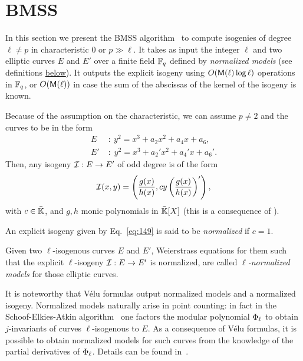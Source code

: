 

\section{BMSS}
\label{sec:bmss}
In this section we present the BMSS
algorithm~\cite{bostan+morain+salvy+schost08} to compute isogenies of
degree $\ell\ne p$ in characteristic $0$ or $p\gg\ell$. It takes as
input the integer $\ell$ and two elliptic curves $E$ and $E'$ over a
finite field $\mathbb{F}_q$ defined by \emph{normalized models} (see
definitions \hyperref[def:canon-isog]{below}). It outputs the explicit
isogeny using $O(\mathsf{M}(\ell)\log\ell)$ operations in $\mathbb{F}_q$, or
$O(\mathsf{M}(\ell))$ in case the sum of the abscissas of the kernel of the
isogeny is known.

  Because of the assumption on
the characteristic, we can assume $p\ne 2$ and the curves to be in
the form
\begin{equation}
  \label{eq:140}
  \begin{aligned}
    E \;&:\: y^2 = x^3 + a_2x^2 + a_4x + a_6\text{,}\\
    E'\;&:\; y^2 = x^3 + a_2'x^2 + a_4'x + a_6'\text{.}
  \end{aligned}
\end{equation}
Then, any isogeny $\mathcal{I}:E\rightarrow E'$ of odd degree is of the form
\begin{equation}
  \label{eq:149}
  \mathcal{I}(x,y) = \left(\frac{g(x)}{h(x)},cy\left(\frac{g(x)}{h(x)}\right)'\right)
  \text{,}
\end{equation}
with $c\in\bar{\mathbb{K}}$, and $g,h$ monic polynomials in $\bar{\mathbb{K}}[X]$
(this is a consequence of ).

\begin{definition}
  \label{def:canon-isog}
  An explicit isogeny given by Eq.~\eqref{eq:149} is said to be
  \emph{normalized}
  if $c=1$. 

  Given two $\ell$-isogenous curves $E$ and $E'$, Weierstrass
  equations for them such that the explicit $\ell$-isogeny
  $\mathcal{I}:E\rightarrow E'$ is normalized, are called
  \emph{$\ell$-normalized models} for those
  elliptic curves.
\end{definition}

 It is noteworthy that Vélu formulas output normalized
models and a normalized isogeny. Normalized models naturally arise in
point counting: in fact in the Schoof-Elkies-Atkin
algorithm~\cite{atkin88,elkies98,schoof95} one factors the modular
polynomial $\Phi_\ell$ to obtain $j$-invariants of curves
$\ell$-isogenous to $E$. As a consequence of Vélu formulas, it is
possible to obtain normalized models for such curves from the
knowledge of the partial derivatives of $\Phi_\ell$.  Details can
be found in~\cite{schoof95,morain95,elkies98,lercier-algorithmique}.

